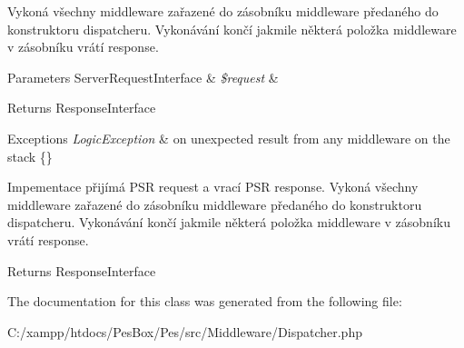 Vykoná všechny middleware zařazené do zásobníku middleware předaného do konstruktoru dispatcheru. Vykonávání končí jakmile některá položka middleware v zásobníku vrátí response.


\begin{DoxyParams}[1]{Parameters}
Server\+Request\+Interface & {\em \$request} & \\
\hline
\end{DoxyParams}
\begin{DoxyReturn}{Returns}
Response\+Interface
\end{DoxyReturn}

\begin{DoxyExceptions}{Exceptions}
{\em Logic\+Exception} & on unexpected result from any middleware on the stack \{\}\\
\hline
\end{DoxyExceptions}
Impementace přijímá P\+SR request a vrací P\+SR response. Vykoná všechny middleware zařazené do zásobníku middleware předaného do konstruktoru dispatcheru. Vykonávání končí jakmile některá položka middleware v zásobníku vrátí response.

\begin{DoxyReturn}{Returns}
Response\+Interface 
\end{DoxyReturn}


The documentation for this class was generated from the following file\+:\begin{DoxyCompactItemize}
\item 
C\+:/xampp/htdocs/\+Pes\+Box/\+Pes/src/\+Middleware/Dispatcher.\+php\end{DoxyCompactItemize}
